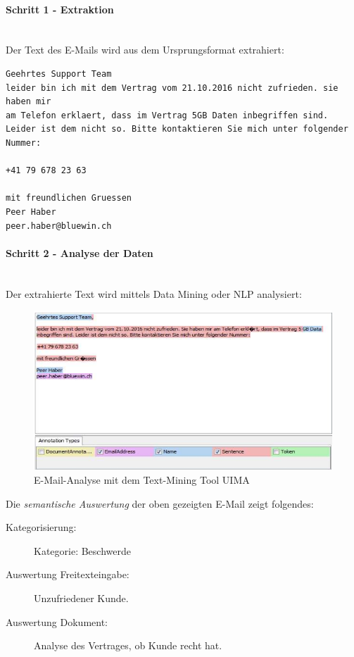 \documentclass[a4paper, 11pt]{article}
\begin{document}
\paragraph{Schritt 1 - Extraktion} \mbox{}\\
Der Text des E-Mails wird aus dem Ursprungsformat extrahiert:

\begin{lstlisting}
Geehrtes Support Team
leider bin ich mit dem Vertrag vom 21.10.2016 nicht zufrieden. sie haben mir 
am Telefon erklaert, dass im Vertrag 5GB Daten inbegriffen sind. 
Leider ist dem nicht so. Bitte kontaktieren Sie mich unter folgender Nummer:

+41 79 678 23 63

mit freundlichen Gruessen
Peer Haber
peer.haber@bluewin.ch
\end{lstlisting}

\newpage

\paragraph{Schritt 2 - Analyse der Daten} \mbox{} \\
Der extrahierte Text wird mittels Data Mining oder NLP analysiert:
\begin{figure}[htb]
	\centering
	\includegraphics[keepaspectratio=true,height=15\baselineskip]{NLP_email.PNG}
	\caption{E-Mail-Analyse mit dem Text-Mining Tool UIMA}
	\label{fig:nlpemail}
\end{figure}

Die \textit{semantische Auswertung} der oben gezeigten E-Mail zeigt folgendes:

\begin{description}
	\item[Kategorisierung: ] Kategorie: Beschwerde
	\item[Auswertung Freitexteingabe: ] Unzufriedener Kunde.
	\item[Auswertung Dokument: ] Analyse des Vertrages, ob Kunde recht hat.
\end{description}
\end{document}
